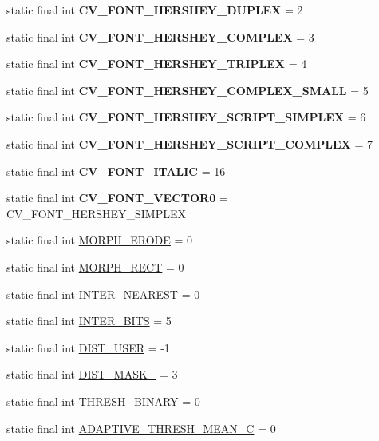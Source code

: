 \begin{DoxyCompactItemize}
\item 
static final int {\bfseries C\+V\+\_\+\+F\+O\+N\+T\+\_\+\+H\+E\+R\+S\+H\+E\+Y\+\_\+\+D\+U\+P\+L\+EX} = 2
\item 
static final int {\bfseries C\+V\+\_\+\+F\+O\+N\+T\+\_\+\+H\+E\+R\+S\+H\+E\+Y\+\_\+\+C\+O\+M\+P\+L\+EX} = 3
\item 
static final int {\bfseries C\+V\+\_\+\+F\+O\+N\+T\+\_\+\+H\+E\+R\+S\+H\+E\+Y\+\_\+\+T\+R\+I\+P\+L\+EX} = 4
\item 
static final int {\bfseries C\+V\+\_\+\+F\+O\+N\+T\+\_\+\+H\+E\+R\+S\+H\+E\+Y\+\_\+\+C\+O\+M\+P\+L\+E\+X\+\_\+\+S\+M\+A\+LL} = 5
\item 
static final int {\bfseries C\+V\+\_\+\+F\+O\+N\+T\+\_\+\+H\+E\+R\+S\+H\+E\+Y\+\_\+\+S\+C\+R\+I\+P\+T\+\_\+\+S\+I\+M\+P\+L\+EX} = 6
\item 
static final int {\bfseries C\+V\+\_\+\+F\+O\+N\+T\+\_\+\+H\+E\+R\+S\+H\+E\+Y\+\_\+\+S\+C\+R\+I\+P\+T\+\_\+\+C\+O\+M\+P\+L\+EX} = 7
\item 
static final int {\bfseries C\+V\+\_\+\+F\+O\+N\+T\+\_\+\+I\+T\+A\+L\+IC} = 16
\item 
static final int {\bfseries C\+V\+\_\+\+F\+O\+N\+T\+\_\+\+V\+E\+C\+T\+O\+R0} = C\+V\+\_\+\+F\+O\+N\+T\+\_\+\+H\+E\+R\+S\+H\+E\+Y\+\_\+\+S\+I\+M\+P\+L\+EX
\item 
static final int \hyperlink{group__imgproc__filter_ga0f22b83b4ad2465132087b8d059a2101}{M\+O\+R\+P\+H\+\_\+\+E\+R\+O\+DE} = 0
\item 
static final int \hyperlink{group__imgproc__filter_ga8380bc8d565b30f65b81f16987e9edeb}{M\+O\+R\+P\+H\+\_\+\+R\+E\+CT} = 0
\item 
static final int \hyperlink{group__imgproc__transform_ga6d084cc56ec2d2c46a7df1a2c0dad300}{I\+N\+T\+E\+R\+\_\+\+N\+E\+A\+R\+E\+ST} = 0
\item 
static final int \hyperlink{group__imgproc__transform_ga076a64e7bcb513b6ff755fccecf7d4bf}{I\+N\+T\+E\+R\+\_\+\+B\+I\+TS} = 5
\item 
static final int \hyperlink{group__imgproc__misc_ga8d734af618e38548a1a6a13d35f7764c}{D\+I\+S\+T\+\_\+\+U\+S\+ER} = -\/1
\item 
static final int \hyperlink{group__imgproc__misc_ga2891253337c4f4e497fe2c46d4580771}{D\+I\+S\+T\+\_\+\+M\+A\+S\+K\+\_} = 3
\item 
static final int \hyperlink{group__imgproc__misc_ga4a5a1fd195b45fbfe4485dbb0a319fbb}{T\+H\+R\+E\+S\+H\+\_\+\+B\+I\+N\+A\+RY} = 0
\item 
static final int \hyperlink{group__imgproc__misc_gaa22bea46672d18b28cbb5f9ec927fca9}{A\+D\+A\+P\+T\+I\+V\+E\+\_\+\+T\+H\+R\+E\+S\+H\+\_\+\+M\+E\+A\+N\+\_\+C} = 0

\end{DoxyCompactItemize}
